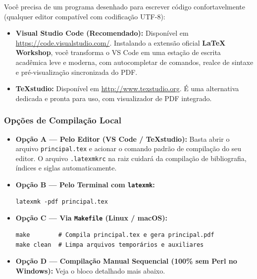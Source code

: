 \documentclass[12pt, a4paper]{article}
\begin{document}
Você precisa de um programa desenhado para escrever código confortavelmente (qualquer editor compatível com codificação UTF-8):
\begin{itemize}
    \item \textbf{Visual Studio Code (Recomendado):} Disponível em \url{https://code.visualstudio.com/}. Instalando a extensão oficial \textbf{LaTeX Workshop}, você transforma o VS Code em uma estação de escrita acadêmica leve e moderna, com autocompletar de comandos, realce de sintaxe e pré-visualização sincronizada do PDF.
    \item \textbf{TeXstudio:} Disponível em \url{http://www.texstudio.org}. É uma alternativa dedicada e pronta para uso, com visualizador de PDF integrado.
\end{itemize}

\subsubsection{Opções de Compilação Local}

\begin{itemize}
    \item \textbf{Opção A --- Pelo Editor (VS Code / TeXstudio):} Basta abrir o arquivo \texttt{principal.tex} e acionar o comando padrão de compilação do seu editor. O arquivo \texttt{.latexmkrc} na raiz cuidará da compilação de bibliografia, índices e siglas automaticamente.
    \item \textbf{Opção B --- Pelo Terminal com \texttt{latexmk}:}
\begin{verbatim}
latexmk -pdf principal.tex
\end{verbatim}
    \item \textbf{Opção C --- Via \texttt{Makefile} (Linux / macOS):}
\begin{verbatim}
make        # Compila principal.tex e gera principal.pdf
make clean  # Limpa arquivos temporários e auxiliares
\end{verbatim}
    \item \textbf{Opção D --- Compilação Manual Sequencial (100\% sem Perl no Windows):} Veja o bloco detalhado mais abaixo.
\end{itemize}
\end{document}
